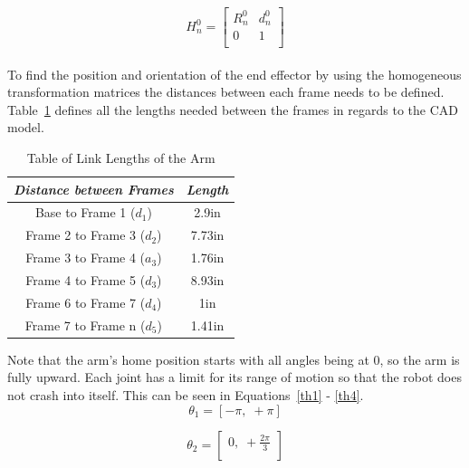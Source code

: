 \begin{equation}
	H^{0}_{n} = \left[\begin{array}{cc}
		R^{0}_{n} & d^{0}_{n} \\
	    0 & 1 \\
	\end{array}\right]
\label{sample_return_rover:fwd_kinematics:H0n}
\end{equation} \\

To find the position and orientation of the end effector by using the homogeneous transformation matrices the distances between each frame needs to be defined. Table~\ref{table:3} defines all the lengths needed between the frames in regards to the CAD model.


\begin{table}[H]
	\begin{center}
		\begin{tabular}{|c|c|} 
			\hline 
			\textit{Distance between Frames} & \textit{Length} \\
			\hline
			Base to Frame 1 ($d_{1}$) & 2.9in \\
			Frame 2 to Frame 3 ($d_{2}$) & 7.73in \\
			Frame 3 to Frame 4 ($a_{3}$) & 1.76in \\
			Frame 4 to Frame 5 ($d_{3}$) & 8.93in \\
			Frame 6 to Frame 7 ($d_{4}$) & 1in \\
			Frame 7 to Frame n ($d_{5}$) & 1.41in \\
			\hline
		\end{tabular}
		\caption{\label{table:3}Table of Link Lengths of the Arm}
	\end{center}
\end{table}

Note that the arm's home position starts with all angles being at 0, so the arm is fully upward. Each joint has a limit for its range of motion so that the robot does not crash into itself. This can be seen in Equations~\ref{th1} - \ref{th4}. \\
\begin{equation}
	\theta_{1} = [-\pi,\; + \pi]
	\label{th1} 
\end{equation}

\begin{equation}
	\theta_{2} = \left[\begin{array}{c}
		0,\; +\frac{2\pi}{3} \\
	\end{array}\right] 
	\label{th2}
\end{equation}

